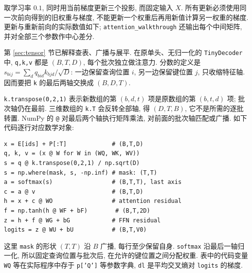 取学习率 $0.1$, 同时用当前梯度更新三个投影, 而固定输入 $X$. 所有更新必须使用同一次前向得到的旧权重与梯度, 不能更新一个权重后再用新值计算另一权重的梯度. 更新与重新前向的实际数值如下; \texttt{attention\_walkthrough} 还输出每个中间矩阵, 并对全部三个参数作中心差分.


\label{sec:attention-code}
第 \ref{sec:tensor} 节已解释查表、广播与展平. 在原单头、无归一化的 \texttt{TinyDecoder} 中, \texttt{q,k,v} 都是 $(B,T,D)$, 每个批次独立做注意力. 分数的定义是 $s_{bij}=\sum_dq_{bid}k_{bjd}/\sqrt D$: 一边保留查询位置 $i$, 另一边保留键位置 $j$, 只收缩特征轴. 因而要把 \texttt{k} 的最后两轴交换成 $(B,D,T)$.

\texttt{k.transpose(0,2,1)} 表示新数组的第 $(b,d,t)$ 项是原数组的第 $(b,t,d)$ 项; 批次轴仍在最前. 三维数组的 \texttt{k.T} 会反转全部轴, 得 $(D,T,B)$, 它不是所需的逐批转置. NumPy 的 \texttt{@} 对最后两个轴执行矩阵乘法, 对前面的批次轴匹配或广播. 如下代码逐行对应数学对象:
\begin{verbatim}
x = E[ids] + P[:T]             # (B,T,D)
q, k, v = (x @ W for W in (WQ, WK, WV))
s = q @ k.transpose(0,2,1) / np.sqrt(D)
s = np.where(mask, s, -np.inf) # mask: (T,T)
a = softmax(s)                 # (B,T,T), last axis
c = a @ v                      # (B,T,D)
h = x + c @ WO                 # attention residual
f = np.tanh(h @ WF + bF)        # (B,T,2D)
z = h + f @ WG + bG            # FFN residual
logits = z @ WU + bU           # (B,T,V0)
\end{verbatim}
这里 \texttt{mask} 的形状 $(T,T)$ 沿 $B$ 广播, 每行至少保留自身. \texttt{softmax} 沿最后一轴归一化, 所以固定查询位置与批次后, 在允许的键位置之间分配权重. 表中的代码变量 \texttt{WQ} 等在实际程序中存于 \texttt{p['Q']} 等参数字典, \texttt{dl} 是平均交叉熵对 \texttt{logits} 的梯度.


